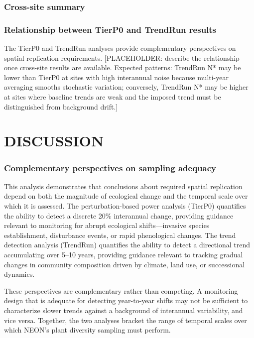 \documentclass[
  11pt,
]{article}
\begin{document}
\subsubsection{Cross-site summary}\label{cross-site-summary-1}

\subsubsection{Relationship between TierP0 and TrendRun
results}\label{relationship-between-tierp0-and-trendrun-results}

The TierP0 and TrendRun analyses provide complementary perspectives on
spatial replication requirements. {[}PLACEHOLDER: describe the
relationship once cross-site results are available. Expected patterns:
TrendRun N* may be lower than TierP0 at sites with high interannual
noise because multi-year averaging smooths stochastic variation;
conversely, TrendRun N* may be higher at sites where baseline trends are
weak and the imposed trend must be distinguished from background
drift.{]}

\section{\uppercase{Discussion}}

\subsubsection{Complementary perspectives on sampling
adequacy}\label{complementary-perspectives-on-sampling-adequacy}

This analysis demonstrates that conclusions about required spatial
replication depend on both the magnitude of ecological change and the
temporal scale over which it is assessed. The perturbation-based power
analysis (TierP0) quantifies the ability to detect a discrete 20\%
interannual change, providing guidance relevant to monitoring for abrupt
ecological shifts---invasive species establishment, disturbance events,
or rapid phenological changes. The trend detection analysis (TrendRun)
quantifies the ability to detect a directional trend accumulating over
5--10 years, providing guidance relevant to tracking gradual changes in
community composition driven by climate, land use, or successional
dynamics.

These perspectives are complementary rather than competing. A monitoring
design that is adequate for detecting year-to-year shifts may not be
sufficient to characterize slower trends against a background of
interannual variability, and vice versa. Together, the two analyses
bracket the range of temporal scales over which NEON's plant diversity
sampling must perform.
\end{document}
